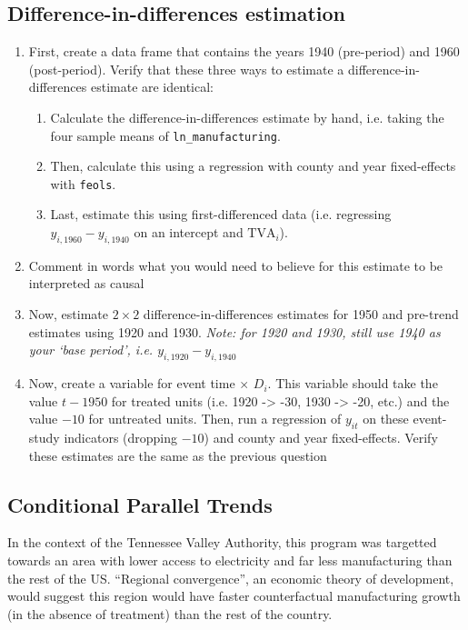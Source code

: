 \documentclass[12pt]{article}
\begin{document}
\subsection*{Difference-in-differences estimation}
\begin{enumerate}
  \item First, create a data frame that contains the years 1940 (pre-period) and 1960 (post-period). Verify that these three ways to estimate a difference-in-differences estimate are identical:
  \begin{enumerate}
    \item Calculate the difference-in-differences estimate by hand, i.e. taking the four sample means of \texttt{ln\_manufacturing}.
    
    \item Then, calculate this using a regression with county and year fixed-effects with \texttt{feols}.
    
    \item Last, estimate this using first-differenced data (i.e. regressing $y_{i,1960} - y_{i,1940}$ on an intercept and $\text{TVA}_i$). 
  \end{enumerate}
  
  \item Comment in words what you would need to believe for this estimate to be interpreted as causal
  
  \item Now, estimate $2 \times 2$ difference-in-differences estimates for 1950 and pre-trend estimates using 1920 and 1930. \emph{Note: for 1920 and 1930, still use 1940 as your `base period', i.e. $y_{i, 1920} - y_{i, 1940}$}
  
  \item Now, create a variable for event time $\times$ $D_i$. This variable should take the value $t - 1950$ for treated units (i.e. 1920 -> -30, 1930 -> -20, etc.) and the value $-10$ for untreated units. Then, run a regression of $y_{it}$ on these event-study indicators (dropping $-10$) and county and year fixed-effects. Verify these estimates are the same as the previous question
\end{enumerate}


\subsection*{Conditional Parallel Trends}

In the context of the Tennessee Valley Authority, this program was targetted towards an area with lower access to electricity and far less manufacturing than the rest of the US. 
``Regional convergence'', an economic theory of development, would suggest this region would have faster counterfactual manufacturing growth (in the absence of treatment) than the rest of the country. 
\end{document}
